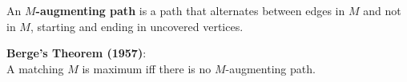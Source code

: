 \begin{definition}

    An \textbf{$M$-augmenting path} is a path that alternates between edges in $M$ and not in $M$,
    starting
    and ending in uncovered vertices.
    
\end{definition}

\begin{theorem}

\textbf{Berge's Theorem (1957)}:\\

    A matching $M$ is maximum iff there is no $M$-augmenting path.
    
\end{theorem}

